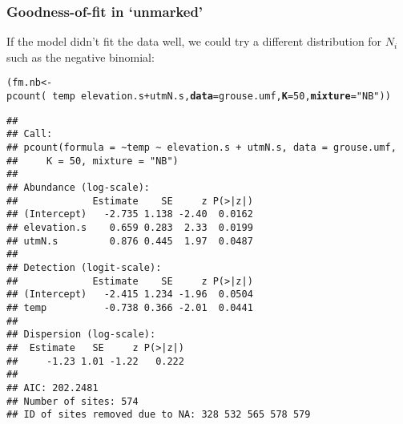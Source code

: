 \documentclass[color=usenames,dvipsnames]{beamer}\usepackage[]{graphicx}\usepackage[]{xcolor}
\makeatletter
\newcommand{\hlnum}[1]{\textcolor[rgb]{0.69,0.494,0}{#1}}%
\newcommand{\hlsng}[1]{\textcolor[rgb]{0.749,0.012,0.012}{#1}}%
\newcommand{\hlopt}[1]{\textcolor[rgb]{0,0,0}{#1}}%
\newcommand{\hldef}[1]{\textcolor[rgb]{0,0,0}{#1}}%
\newcommand{\hlkwb}[1]{\textcolor[rgb]{0,0.341,0.682}{#1}}%
\newcommand{\hlkwc}[1]{\textcolor[rgb]{0,0,0}{\textbf{#1}}}%
\newcommand{\hlkwd}[1]{\textcolor[rgb]{0.004,0.004,0.506}{#1}}%
\newenvironment{kframe}{%
 \def\at@end@of@kframe{}%
 \ifinner\ifhmode%
  \def\at@end@of@kframe{\end{minipage}}%
  \begin{minipage}{\columnwidth}%
 \fi\fi%
 \def\FrameCommand##1{\hskip\@totalleftmargin \hskip-\fboxsep
 \colorbox{shadecolor}{##1}\hskip-\fboxsep
     \hskip-\linewidth \hskip-\@totalleftmargin \hskip\columnwidth}%
 \MakeFramed {\advance\hsize-\width
   \@totalleftmargin\z@ \linewidth\hsize
   \@setminipage}}%
 {\par\unskip\endMakeFramed%
 \at@end@of@kframe}
\newenvironment{knitrout}{}{} %
\makeatother
\begin{document}
\begin{frame}[fragile]
  \frametitle{Goodness-of-fit in `unmarked'}
  \small
  If the model didn't fit the data well, we could try a different
  distribution for $N_i$ such as the negative binomial:
\begin{knitrout}\tiny
{}\color{fgcolor}\begin{kframe}
\begin{alltt}
\hldef{(fm.nb} \hlkwb{<-} \hlkwd{pcount}\hldef{(}\hlopt{~}\hldef{temp} \hlopt{~} \hldef{elevation.s}\hlopt{+}\hldef{utmN.s,} \hlkwc{data}\hldef{=grouse.umf,} \hlkwc{K}\hldef{=}\hlnum{50}\hldef{,} \hlkwc{mixture}\hldef{=}\hlsng{"NB"}\hldef{))}
\end{alltt}
\begin{verbatim}
## 
## Call:
## pcount(formula = ~temp ~ elevation.s + utmN.s, data = grouse.umf, 
##     K = 50, mixture = "NB")
## 
## Abundance (log-scale):
##             Estimate    SE     z P(>|z|)
## (Intercept)   -2.735 1.138 -2.40  0.0162
## elevation.s    0.659 0.283  2.33  0.0199
## utmN.s         0.876 0.445  1.97  0.0487
## 
## Detection (logit-scale):
##             Estimate    SE     z P(>|z|)
## (Intercept)   -2.415 1.234 -1.96  0.0504
## temp          -0.738 0.366 -2.01  0.0441
## 
## Dispersion (log-scale):
##  Estimate   SE     z P(>|z|)
##     -1.23 1.01 -1.22   0.222
## 
## AIC: 202.2481 
## Number of sites: 574
## ID of sites removed due to NA: 328 532 565 578 579
\end{verbatim}
\end{kframe}
\end{knitrout}
\end{frame}
\end{document}
